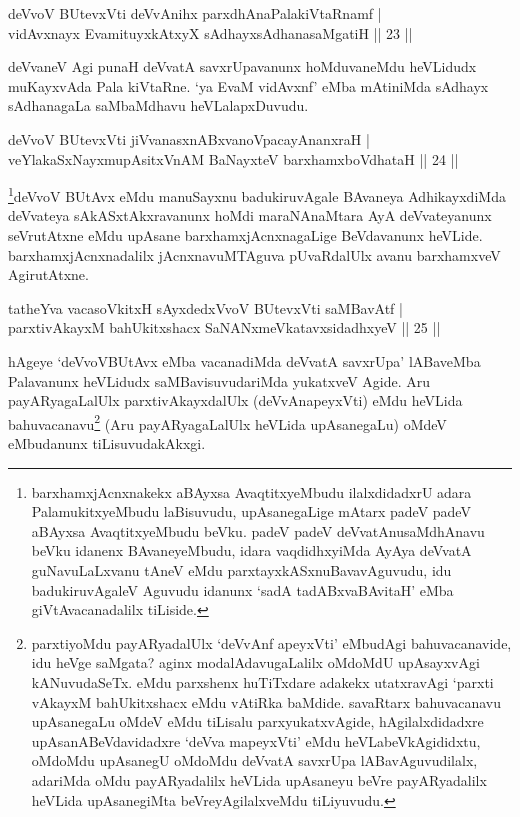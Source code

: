 \begin{shl}
deVvoV BUtevxVti deVvAnihx parxdhAnaPalakiVtaRnamf |\\
vidAvxnayx EvamituyxkAtxyX sAdhayxsAdhanasaMgatiH \hfill || 23 || 
\end{shl}

\begin{artha}
deVvaneV Agi punaH deVvatA savxrUpavanunx hoMduvaneMdu heVLidudx muKayxvAda Pala kiVtaRne. `ya EvaM vidAvxnf' eMba mAtiniMda sAdhayx sAdhanagaLa saMbaMdhavu heVLalapxDuvudu.
\end{artha}

\begin{shl}
deVvoV BUtevxVti jiVvanasxnABxvanoVpacayAnanxraH |\\
veYlakaSxNayxmupAsitxVnAM BaNayxteV barxhamxboVdhataH \hfill || 24 || 
\end{shl}

\begin{artha}
\footnote{barxhamxjAcnxnakekx aBAyxsa AvaqtitxyeMbudu ilalxdidadxrU adara PalamukitxyeMbudu laBisuvudu, upAsanegaLige mAtarx padeV padeV aBAyxsa AvaqtitxyeMbudu beVku. padeV padeV deVvatAnusaMdhAnavu beVku idanenx BAvaneyeMbudu, idara vaqdidhxyiMda AyAya deVvatA guNavuLaLxvanu tAneV eMdu parxtayxkASxnuBavavAguvudu, idu badukiruvAgaleV Aguvudu idanunx `sadA tadABxvaBAvitaH' eMba giVtAvacanadalilx tiLiside.}deVvoV BUtAvx eMdu manuSayxnu badukiruvAgale BAvaneya AdhikayxdiMda deVvateya sAkASxtAkxravanunx hoMdi maraNAnaMtara AyA deVvateyanunx seVrutAtxne eMdu upAsane barxhamxjAcnxnagaLige BeVdavanunx heVLide. barxhamxjAcnxnadalilx jAcnxnavuMTAguva pUvaRdalUlx avanu barxhamxveV AgirutAtxne.
\end{artha}

\begin{shl}
tatheYva vacasoVkitxH sAyxdedxVvoV BUtevxVti saMBavAtf |\\
parxtivAkayxM bahUkitxshacx SaNANxmeVkatavxsidadhxyeV \hfill || 25 || 
\end{shl}

\begin{artha}
hAgeye  `deVvoVBUtAvx eMba vacanadiMda deVvatA savxrUpa' lABaveMba Palavanunx heVLidudx saMBavisuvudariMda yukatxveV Agide. Aru payARyagaLalUlx parxtivAkayxdalUlx (deVvAnapeyxVti) eMdu heVLida bahuvacanavu\footnote{parxtiyoMdu payARyadalUlx `deVvAnf apeyxVti' eMbudAgi bahuvacanavide, idu heVge saMgata? aginx modalAdavugaLalilx oMdoMdU upAsayxvAgi kANuvudaSeTx. eMdu parxshenx huTiTxdare adakekx utatxravAgi `parxti vAkayxM bahUkitxshacx eMdu vAtiRka baMdide. savaRtarx bahuvacanavu upAsanegaLu oMdeV eMdu tiLisalu parxyukatxvAgide, hAgilalxdidadxre upAsanABeVdavidadxre `deVva mapeyxVti' eMdu heVLabeVkAgididxtu, oMdoMdu upAsanegU oMdoMdu deVvatA savxrUpa lABavAguvudilalx, adariMda oMdu payARyadalilx heVLida upAsaneyu beVre payARyadalilx heVLida upAsanegiMta beVreyAgilalxveMdu tiLiyuvudu.} (Aru payARyagaLalUlx heVLida upAsanegaLu) oMdeV eMbudanunx tiLisuvudakAkxgi.
\end{artha}

